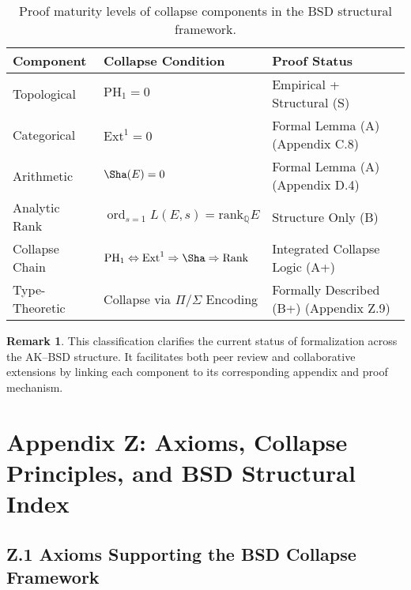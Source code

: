 \documentclass[11pt]{article}
\theoremstyle{definition}
\newtheorem{remark}[theorem]{Remark}
\begin{document}
\begin{table}[H]
\centering
\begin{tabular}{lll}
\toprule
\textbf{Component} & \textbf{Collapse Condition} & \textbf{Proof Status} \\
\midrule
Topological        & \( \mathrm{PH}_1 = 0 \)              & Empirical + Structural (S) \\
Categorical        & \( \mathrm{Ext}^1 = 0 \)             & Formal Lemma (A) \quad (Appendix C.8) \\
Arithmetic         & \( \Sha(E) = 0 \)                    & Formal Lemma (A) \quad (Appendix D.4) \\
Analytic Rank      & \( \operatorname{ord}_{s=1} L(E,s) = \mathrm{rank}_\mathbb{Q}E \) & Structure Only (B) \\
Collapse Chain     & \( \mathrm{PH}_1 \Leftrightarrow \mathrm{Ext}^1 \Rightarrow \Sha \Rightarrow \text{Rank} \) & Integrated Collapse Logic (A+) \\
Type-Theoretic     & Collapse via \( \Pi/\Sigma \) Encoding & Formally Described (B+) \quad (Appendix Z.9) \\
\bottomrule
\end{tabular}
\caption{Proof maturity levels of collapse components in the BSD structural framework.}
\end{table}

\begin{remark}
This classification clarifies the current status of formalization across the AK–BSD structure.  
It facilitates both peer review and collaborative extensions by linking each component  
to its corresponding appendix and proof mechanism.
\end{remark}



\section*{Appendix Z: Axioms, Collapse Principles, and BSD Structural Index}

\subsection*{Z.1 Axioms Supporting the BSD Collapse Framework}
\end{document}
